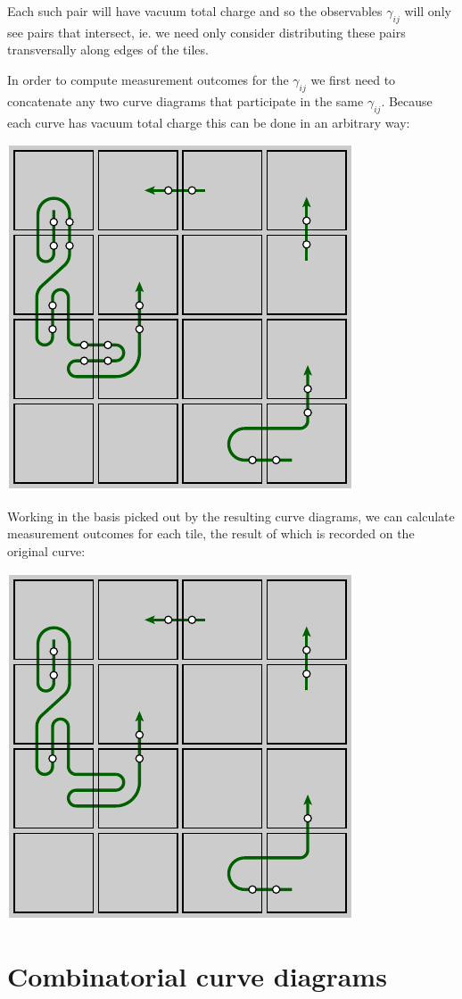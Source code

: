 \documentclass[aps, prl, letterpaper, twocolumn, superscriptaddress, notitlepage, 10pt]{revtex4-1}
\begin{document}
Each such pair will have vacuum total charge and so the observables
$\gamma_{ij}$ will only see pairs that intersect, ie. we
need only consider distributing these pairs
transversally along edges of the tiles.

In order to compute measurement outcomes for the $\gamma_{ij}$
we first need to concatenate any two curve diagrams that 
participate in the same $\gamma_{ij}.$
Because each curve has vacuum total charge this can be
done in an arbitrary way:
\begin{center}
\includegraphics[width=0.3\columnwidth ]{pic-join-pairs.pdf}
\end{center}

Working in the basis picked out by the resulting curve
diagrams, we can calculate measurement outcomes for each tile,
the result of which is recorded on the original curve:
\begin{center}
\includegraphics[width=0.3\columnwidth ]{pic-curve-uniq.pdf}
\end{center}



%
%
\section{Combinatorial curve diagrams}
\end{document}
